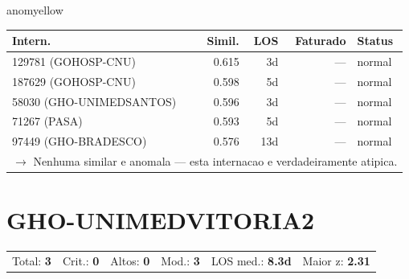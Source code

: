 \documentclass[a4paper,10pt]{article}
\begin{document}
\begin{anomalycard}[Internacao 2075 | GHO-SAMI | MODERADO (z=2.00)]{anomyellow}
\begin{tabular}{l r r r l}\toprule\textbf{Intern.} & \textbf{Simil.} & \textbf{LOS} & \textbf{Faturado} & \textbf{Status} \\\midrule
129781 (GOHOSP-CNU) & 0.615 & 3d & --- & \textcolor{jcubeblue}{normal} \\
187629 (GOHOSP-CNU) & 0.598 & 5d & --- & \textcolor{jcubeblue}{normal} \\
58030 (GHO-UNIMEDSANTOS) & 0.596 & 3d & --- & \textcolor{jcubeblue}{normal} \\
71267 (PASA) & 0.593 & 5d & --- & \textcolor{jcubeblue}{normal} \\
97449 (GHO-BRADESCO) & 0.576 & 13d & --- & \textcolor{jcubeblue}{normal} \\
\multicolumn{5}{l}{\textcolor{jcubeblue}{\small $\rightarrow$ Nenhuma similar e anomala --- esta internacao e verdadeiramente atipica.}} \\
\bottomrule\end{tabular}


\end{anomalycard}

\newpage

\clearpage
\section{GHO-UNIMEDVITORIA2}
\begin{tcolorbox}[colback=lightblue,colframe=jcubeblue,title={\textbf{Resumo --- GHO-UNIMEDVITORIA2}}]
\begin{tabular}{ll@{\quad}ll@{\quad}ll}
Total: \textbf{3} &
Crit.: \textcolor{anomred}{\textbf{0}} &
Altos: \textcolor{anomorange}{\textbf{0}} &
Mod.: \textcolor{anomyellow}{\textbf{3}} &
LOS med.: \textbf{8.3d} &
Maior z: \textbf{2.31} \\


\end{tabular}
\end{tcolorbox}
\end{document}
